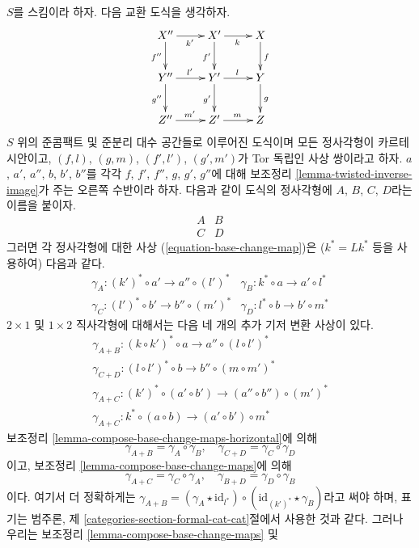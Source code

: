 \begin{remark}
\label{remark-going-around}
$S$를 스킴이라 하자. 다음 교환 도식을 생각하자.
$$
\xymatrix{
X'' \ar[r]_{k'} \ar[d]_{f''} & X' \ar[r]_k \ar[d]_{f'} & X \ar[d]^f \\
Y'' \ar[r]^{l'} \ar[d]_{g''} & Y' \ar[r]^l \ar[d]_{g'} & Y \ar[d]^g \\
Z'' \ar[r]^{m'} & Z' \ar[r]^m & Z
}
$$
$S$ 위의 준콤팩트 및 준분리 대수 공간들로 이루어진 도식이며 모든
정사각형이 카르테시안이고,
$(f,l)$, $(g,m)$, $(f',l')$, $(g',m')$가 Tor 독립인 사상 쌍이라고 하자.
$a$, $a'$, $a''$, $b$, $b'$, $b''$를 각각
$f$, $f'$, $f''$, $g$, $g'$, $g''$에 대해 보조정리
\ref{lemma-twisted-inverse-image}가 주는 오른쪽 수반이라 하자.
다음과 같이 도식의 정사각형에 $A$, $B$, $C$, $D$라는 이름을 붙이자.
$$
\begin{matrix}
A & B \\
C & D
\end{matrix}
$$
그러면 각 정사각형에 대한 사상 (\ref{equation-base-change-map})은
($k^*=Lk^*$ 등을 사용하여) 다음과 같다.
$$
\begin{matrix}
\gamma_A : (k')^* \circ a' \to a'' \circ (l')^* &
\gamma_B : k^* \circ a \to a' \circ l^* \\
\gamma_C : (l')^* \circ b' \to b'' \circ (m')^* &
\gamma_D : l^* \circ b \to b' \circ m^*
\end{matrix}
$$
$2 \times 1$ 및 $1 \times 2$ 직사각형에 대해서는 다음 네 개의
추가 기저 변환 사상이 있다.
$$
\begin{matrix}
\gamma_{A + B} : (k \circ k')^* \circ a \to a'' \circ (l \circ l')^* \\
\gamma_{C + D} : (l \circ l')^* \circ b \to b'' \circ (m \circ m')^* \\
\gamma_{A + C} : (k')^* \circ (a' \circ b') \to (a'' \circ b'') \circ (m')^* \\
\gamma_{A + C} : k^* \circ (a \circ b) \to (a' \circ b') \circ m^*
\end{matrix}
$$
보조정리 \ref{lemma-compose-base-change-maps-horizontal}에 의해
$$
\gamma_{A + B} = \gamma_A \circ \gamma_B, \quad
\gamma_{C + D} = \gamma_C \circ \gamma_D
$$
이고, 보조정리 \ref{lemma-compose-base-change-maps}에 의해
$$
\gamma_{A + C} = \gamma_C \circ \gamma_A, \quad
\gamma_{B + D} = \gamma_D \circ \gamma_B
$$
이다. 여기서 더 정확하게는
$\gamma_{A + B} = (\gamma_A \star \text{id}_{l^*}) \circ
(\text{id}_{(k')^*} \star \gamma_B)$라고 써야 하며, 표기는 범주론,
제 \ref{categories-section-formal-cat-cat}절에서 사용한 것과 같다.
그러나 우리는 보조정리 \ref{lemma-compose-base-change-maps} 및

\end{remark}
